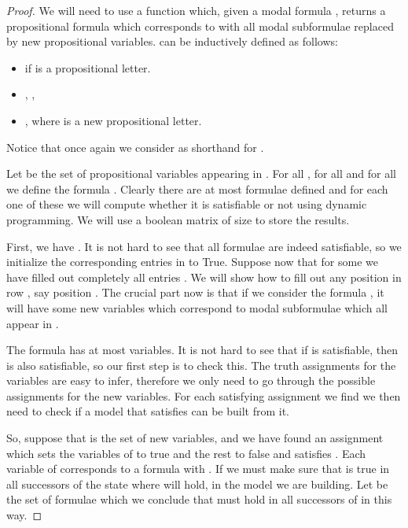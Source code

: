 \documentclass{llncs}
\begin{document}
\begin{proof}



We will need to use a function  which, given a modal formula
, returns a propositional formula which corresponds to  with all
modal subformulae replaced by new propositional variables.  can be
inductively defined as follows:

\begin{itemize}

\item  if  is a propositional letter.

\item ,
  ,
  

\item , where  is
a new propositional letter.

\end{itemize}

Notice that once again we consider  as shorthand
for .

Let  be the set of propositional
variables appearing in . For all , for
all  and for all  we define
the formula . Clearly there are at most  formulae
 defined and for each one of these we will compute
whether it is satisfiable or not using dynamic programming. We will
use a boolean matrix  of size  to store the results.

First, we have . It is not hard to see that all
formulae  are indeed satisfiable, so we initialize the
corresponding entries in  to True. Suppose now that for some  we have
filled out completely all entries . We will show how to fill out
any position in row , say position . The crucial part now is that
if we consider the formula , it will have some new variables
 which correspond to modal subformulae which all appear in .

The formula  has at most  variables. It is not hard to see
that if  is satisfiable, then  is also satisfiable,
so our first step is to check this. The truth assignments for the  variables
are easy to infer, therefore we only need to go through the  possible assignments
for the new variables. For each satisfying assignment we find we then need to
check if a model that satisfies  can be built from it.

So, suppose that  is the set of new variables, and we have found an assignment
which sets the variables of  to true and the rest to false and
satisfies . Each variable  of  corresponds to a formula
 with . If  we must make sure that
 is true in all successors of the state  where  will hold, in
the model we are building. Let  be the set of formulae 
which we conclude that must hold in all successors of  in this way.


\end{proof}
\end{document}
